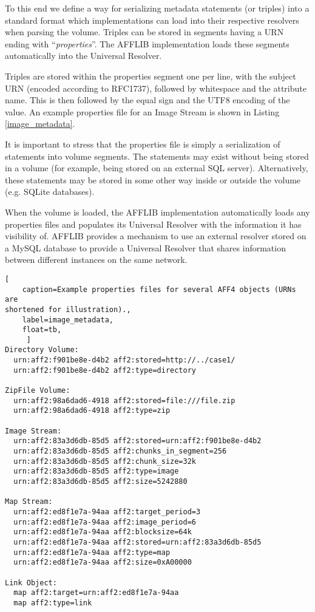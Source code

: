\documentclass[10pt, conference]{IEEEtran}
\begin{document}
To this end we define a way for serializing metadata statements (or
triples) into a standard format which implementations can load into
their respective resolvers when parsing the volume. Triples can be
stored in segments having a URN ending with ``{\em properties}''. The
AFFLIB implementation loads these segments automatically into the
Universal Resolver. 

Triples are stored within the properties segment one per line, with
the subject URN (encoded according to RFC1737), followed by whitespace
and the attribute name. This is then followed by the equal sign and
the UTF8 encoding of the value. An example properties file for an
Image Stream is shown in Listing \ref{image_metadata}.

It is important to stress that the properties file is simply a
serialization of statements into volume segments. The statements may
exist without being stored in a volume (for example, being stored on
an external SQL server). Alternatively, these statements may be stored
in some other way inside or outside the volume (e.g. SQLite
databases).

When the volume is loaded, the AFFLIB implementation automatically
loads any properties files and populates its Universal Resolver with
the information it has visibility of. AFFLIB provides a mechanism to
use an external resolver stored on a MySQL database to provide a
Universal Resolver that shares information between different instances
on the same network.

\begin{lstlisting}[
	caption=Example properties files for several AFF4 objects (URNs are
shortened for illustration).,
	label=image_metadata,
	float=tb,
	 ]
Directory Volume:
  urn:aff2:f901be8e-d4b2 aff2:stored=http://../case1/
  urn:aff2:f901be8e-d4b2 aff2:type=directory

ZipFile Volume:
  urn:aff2:98a6dad6-4918 aff2:stored=file:///file.zip
  urn:aff2:98a6dad6-4918 aff2:type=zip

Image Stream:
  urn:aff2:83a3d6db-85d5 aff2:stored=urn:aff2:f901be8e-d4b2
  urn:aff2:83a3d6db-85d5 aff2:chunks_in_segment=256
  urn:aff2:83a3d6db-85d5 aff2:chunk_size=32k
  urn:aff2:83a3d6db-85d5 aff2:type=image
  urn:aff2:83a3d6db-85d5 aff2:size=5242880

Map Stream:
  urn:aff2:ed8f1e7a-94aa aff2:target_period=3
  urn:aff2:ed8f1e7a-94aa aff2:image_period=6
  urn:aff2:ed8f1e7a-94aa aff2:blocksize=64k
  urn:aff2:ed8f1e7a-94aa aff2:stored=urn:aff2:83a3d6db-85d5
  urn:aff2:ed8f1e7a-94aa aff2:type=map
  urn:aff2:ed8f1e7a-94aa aff2:size=0xA00000

Link Object:
  map aff2:target=urn:aff2:ed8f1e7a-94aa
  map aff2:type=link
\end{lstlisting}
\end{document}
